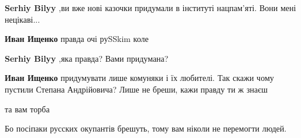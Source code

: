 \begin{itemize}
\begin{itemize}
\textbf{Serhiy Bilyy} ,ви вже нові казочки придумали в інституті нацпам'яті. Вони мені нецікаві...

 
\textbf{Иван Ищенко} правда очі руSSkim коле

 
\textbf{Serhiy Bilyy} ,яка правда? Вами придумана?

 
\textbf{Иван Ищенко} придумувати лише комуняки і їх любителі.
Так скажи чому пустили Степана Андрійовича? Лише не бреши, кажи правду ти ж знаєш

\end{itemize}

 
та вам торба

 
Бо посіпаки русских окупантів брешуть, тому вам ніколи не перемогти людей.

\begin{itemize}
 

\end{itemize}
\end{itemize}
